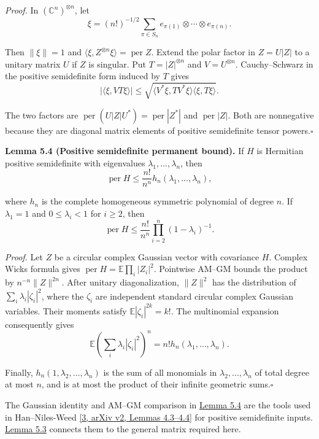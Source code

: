 \documentclass[11pt,a4paper]{article}
\makeatletter
\newcommand{\paperstatement}[3]{\par\addvspace{6pt}\Needspace{4\baselineskip}\phantomsection\def\@currentlabel{#2}\label{#3}\noindent\textbf{#1}\enspace}
\newcommand{\paperref}[2]{\hyperref[#1]{#2}}
\makeatother
\begin{document}
\emph{Proof.} In \((\mathbb C^n)^{\otimes n}\), let
\[\xi=(n!)^{-1/2}
\sum_{\pi\in S_n}
e_{\pi(1)}\otimes\cdots\otimes e_{\pi(n)}.\]

Then \(\|\xi\|=1\) and \(\langle\xi,Z^{\otimes n}\xi\rangle=\operatorname{per}Z\). Extend the polar factor in \(Z=U|Z|\) to a unitary matrix \(U\) if \(Z\) is singular. Put \(T=|Z|^{\otimes n}\) and \(V=U^{\otimes n}\). Cauchy--Schwarz in the positive semidefinite form induced by \(T\) gives
\[|\langle\xi,VT\xi\rangle|
\le\sqrt{\langle V^*\xi,TV^*\xi\rangle
\langle\xi,T\xi\rangle}.\]

The two factors are \(\operatorname{per}(U|Z|U^*)=\operatorname{per}|Z^*|\) and \(\operatorname{per}|Z|\). Both are nonnegative because they are diagonal matrix elements of positive semidefinite tensor powers.\nobreak\hspace{.5em}\mbox{$\square$}

\paperstatement{Lemma 5.4 (Positive semidefinite permanent bound).}{5.4}{thm-5.4} If \(H\) is Hermitian positive semidefinite with eigenvalues \(\lambda_1,\ldots,\lambda_n\), then
\[\operatorname{per}H\le\frac{n!}{n^n}h_n(\lambda_1,\ldots,\lambda_n),\]

where \(h_n\) is the complete homogeneous symmetric polynomial of degree \(n\). If \(\lambda_1=1\) and \(0\le\lambda_i<1\) for \(i\ge2\), then
\[\operatorname{per}H\le\frac{n!}{n^n}
\prod_{i=2}^n(1-\lambda_i)^{-1}.\]

\emph{Proof.} Let \(Z\) be a circular complex Gaussian vector with covariance \(H\). Complex Wick\textquotesingle s formula gives \(\operatorname{per}H=\mathbb E\prod_i|Z_i|^2\). Pointwise AM--GM bounds the product by \(n^{-n}\|Z\|^{2n}\). After unitary diagonalization, \(\|Z\|^2\) has the distribution of \(\sum_i\lambda_i|\zeta_i|^2\), where the \(\zeta_i\) are independent standard circular complex Gaussian variables. Their moments satisfy \(\mathbb E|\zeta_i|^{2k}=k!\). The multinomial expansion consequently gives
\[\mathbb E\left(\sum_i\lambda_i|\zeta_i|^2\right)^n
=n!h_n(\lambda_1,\ldots,\lambda_n).\]

Finally, \(h_n(1,\lambda_2,\ldots,\lambda_n)\) is the sum of all monomials in \(\lambda_2,\ldots,\lambda_n\) of total degree at most \(n\), and is at most the product of their infinite geometric sums.\nobreak\hspace{.5em}\mbox{$\square$}

The Gaussian identity and AM--GM comparison in \paperref{thm-5.4}{Lemma 5.4} are the tools used in Han--Niles-Weed \paperref{bib-3}{[3, arXiv v2, Lemmas 4.3–4.4]} for positive semidefinite inputs. \paperref{thm-5.3}{Lemma 5.3} connects them to the general matrix required here.
\end{document}
